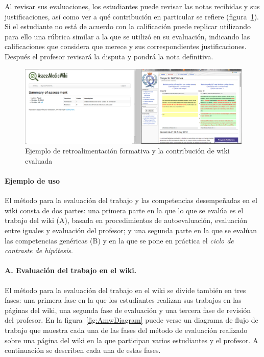 		Al revisar sus evaluaciones, los estudiantes puede revisar las notas recibidas y sus justificaciones, así como ver a qué contribución en particular se refiere (figura~\ref{fig:AmwFormative}). Si el estudiante no está de acuerdo con la calificación puede replicar utilizando para ello una rúbrica similar a la que se utilizó en su evaluación, indicando las calificaciones que considera que merece y sus correspondientes justificaciones. Después el profesor revisará la disputa y pondrá la nota definitiva.

\begin{figure}
  \begin{center}
    \includegraphics[scale=0.19]{AmwFormative.png}
  \end{center}
  \caption{Ejemplo de retroalimentación formativa y la contribución de wiki evaluada}
  \label{fig:AmwFormative}
\end{figure}

			\paragraph{Ejemplo de uso}

			El método para la evaluación del trabajo y las competencias desempeñadas en el wiki consta de dos partes: una primera parte en la que lo que se evalúa es el trabajo del wiki (A), basada en procedimientos de autoevaluación, evaluación entre iguales y evaluación del profesor; y una segunda parte en la que se evalúan las competencias genéricas (B) y en la que se pone en práctica el \emph{ciclo de contraste de hipótesis}.

			\paragraph*{A. Evaluación del trabajo en el wiki.}

			El método para la evaluación del trabajo en el wiki se divide también en tres fases: una primera fase en la que los estudiantes realizan sus trabajos en las páginas del wiki, una segunda fase de evaluación y una tercera fase de revisión del profesor. En la figura~\ref{fig:AmwDiagram} puede verse un diagrama de flujo de trabajo que muestra cada una de las fases del método de evaluación realizado sobre una página del wiki en la que participan varios estudiantes y el profesor. A continuación se describen cada una de estas fases.

